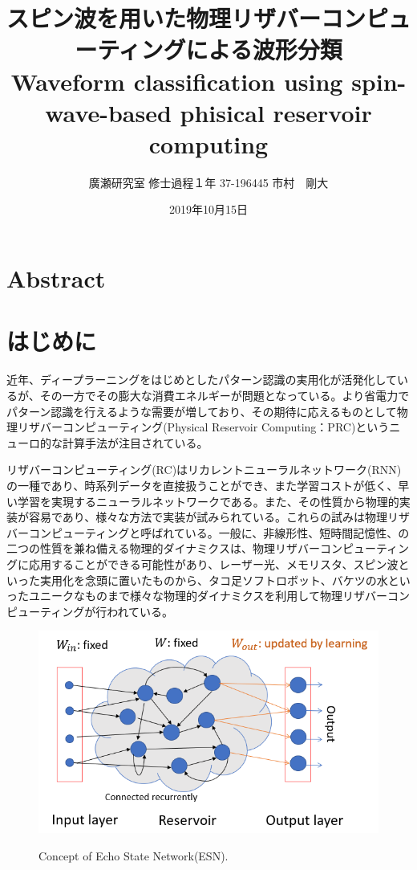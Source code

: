 \documentclass[a4j, twocolumn]{jsarticle}
\title{スピン波を用いた物理リザバーコンピューティングによる波形分類\\Waveform classification using spin-wave-based phisical reservoir computing}
\author{廣瀬研究室 修士過程１年 37-196445 市村　剛大}
\date{2019年10月15日}
\begin{document}

\section*{Abstract}


\section{はじめに}
近年、ディープラーニングをはじめとしたパターン認識の実用化が活発化しているが、その一方でその膨大な消費エネルギーが問題となっている。より省電力でパターン認識を行えるような需要が増しており、その期待に応えるものとして物理リザバーコンピューティング(Physical Reservoir Computing：PRC)というニューロ的な計算手法が注目されている。

リザバーコンピューティング(RC)はリカレントニューラルネットワーク(RNN)の一種であり、時系列データを直接扱うことができ、また学習コストが低く、早い学習を実現するニューラルネットワークである。また、その性質から物理的実装が容易であり、様々な方法で実装が試みられている。これらの試みは物理リザバーコンピューティングと呼ばれている。一般に、非線形性、短時間記憶性、の二つの性質を兼ね備える物理的ダイナミクスは、物理リザバーコンピューティングに応用することができる可能性があり、レーザー光\cite{opt}、メモリスタ、スピン波\cite{spin_reservoir}といった実用化を念頭に置いたものから、タコ足ソフトロボット\cite{Nakajima2015SciReo:_infor_proce_via_physi_soft_body}、バケツの水\cite{Fernando2003AL:_patter_recog_in_a_bucke}といったユニークなものまで様々な物理的ダイナミクスを利用して物理リザバーコンピューティングが行われている。

\begin{figure}
\centering
\includegraphics[width=1\hsize]{./figures/esn}\\
\caption{Concept of Echo State Network(ESN).}
\label{fig:esn}
\end{figure}
\end{document}
